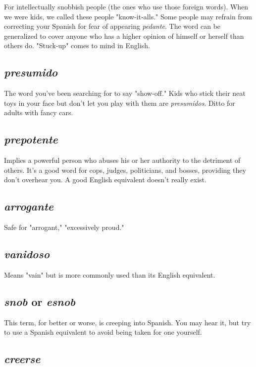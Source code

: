 \documentclass[14pt,a4paper,oneside]{memoir}
\begin{document}
For intellectually snobbish people (the ones who
use those foreign words). When we were kids, we called these people
"know-it-alls." Some people may refrain from correcting your Spanish
for fear of appearing \emph{pedante}. The word can be generalized to cover
anyone who has a higher opinion of himself or herself than others do.
"Stuck-up" comes to mind in English.

\subsection{\emph{presumido}}

The word you've been searching for to say
"show-off." Kids who stick their neat toys in your face but don't let
you play with them are \emph{presumidos}. Ditto for adults with fancy cars.

\subsection{\emph{prepotente}}

Implies a powerful person who abuses his or
her authority to the detriment of others. It's a good word for cops,
judges, politicians, and bosses, providing they don't overhear you. A
good English equivalent doesn't really exist.

\subsection{\emph{arrogante}}

Safe for "arrogant," "excessively proud."

\subsection{\emph{vanidoso}}

Means "vain" but is more commonly used than
its English equivalent.

\subsection{\emph{snob} or \emph{esnob}}

This term, for better or worse, is creeping
into Spanish. You may hear it, but try to use a Spanish equivalent to
avoid being taken for one yourself.

\subsection{\emph{creerse}}
\end{document}

